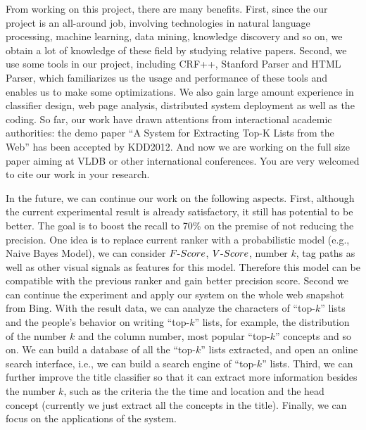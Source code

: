 From working on this project, there are many benefits. First, since the our project is an all-around job, involving technologies in natural language processing, machine learning, data mining, knowledge discovery and so on, we obtain a lot of knowledge of these field by studying relative papers. Second, we use some tools in our project, including CRF++, Stanford Parser and HTML Parser, which familiarizes us the usage and performance of these tools and enables us to make some optimizations. We also gain large amount experience in classifier design, web page analysis, distributed system deployment as well as the coding. So far, our work have drawn attentions from interactional academic authorities: the demo paper\cite{ZZX2012KDD} ``A System for Extracting Top-K Lists from the Web'' has been accepted by KDD2012. And now we are working on the full size paper aiming at VLDB or other international conferences. You are very welcomed to cite our work in your research.

In the future, we can continue our work on the following aspects. First, although the current experimental result is already satisfactory, it still has potential to be better. The goal is to boost the recall to 70\% on the premise of not reducing the precision.
One idea is to replace current ranker with a probabilistic model (e.g., Naive Bayes Model), we can consider $F\textnormal{-}Score$, $V\textnormal{-}Score$, number $k$, tag paths as well as other visual signals as features for this model. Therefore this model can be compatible with the previous ranker and gain better precision score.
Second we can continue the experiment and apply our system on the whole web snapshot from Bing. With the result data, we can analyze the characters of ``top-$k$'' lists and the people's behavior on writing ``top-$k$'' lists,
for example, the distribution of the number $k$ and the column number, most popular ``top-$k$'' concepts and so on.
We can build a database of all the ``top-$k$'' lists extracted, and open an online search interface, i.e., we can build a search engine of ``top-$k$'' lists. Third, we can further improve the title classifier so that it can extract more information besides the number $k$, such as the criteria the the time and location and the head concept (currently we just extract all the concepts in the title).
Finally, we can focus on the applications of the system.

